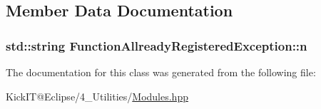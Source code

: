 \subsection{Member Data Documentation}
\subsubsection[{\texorpdfstring{n}{n}}]{\setlength{\rightskip}{0pt plus 5cm}std\+::string Function\+Allready\+Registered\+Exception\+::n\hspace{0.3cm}{\ttfamily [protected]}}\hypertarget{class_function_allready_registered_exception_a1abc7e199a6c70ccb1215a879615944c}{}\label{class_function_allready_registered_exception_a1abc7e199a6c70ccb1215a879615944c}


The documentation for this class was generated from the following file\+:\begin{DoxyCompactItemize}
\item 
Kick\+I\+T@\+Eclipse/4\+\_\+\+Utilities/\hyperlink{_modules_8hpp}{Modules.\+hpp}\end{DoxyCompactItemize}
